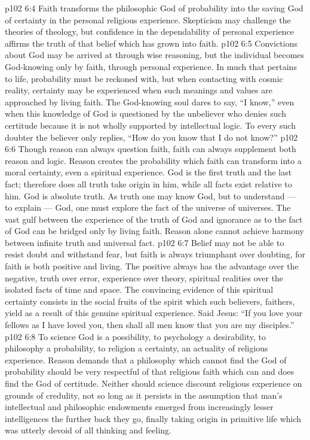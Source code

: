 \vs p102 6:4 Faith transforms the philosophic God of probability into the saving God of certainty in the personal religious experience. Skepticism may challenge the theories of theology, but confidence in the dependability of personal experience affirms the truth of that belief which has grown into faith.
\vs p102 6:5 Convictions about God may be arrived at through wise reasoning, but the individual becomes God\hyp{}knowing only by faith, through personal experience. In much that pertains to life, probability must be reckoned with, but when contacting with cosmic reality, certainty may be experienced when such meanings and values are approached by living faith. The God\hyp{}knowing soul dares to say, “I know,” even when this knowledge of God is questioned by the unbeliever who denies such certitude because it is not wholly supported by intellectual logic. To every such doubter the believer only replies, “How do you know that I do not know?”
\vs p102 6:6 \pc Though reason can always question faith, faith can always supplement both reason and logic. Reason creates the probability which faith can transform into a moral certainty, even a spiritual experience. God is the first truth and the last fact; therefore does all truth take origin in him, while all facts exist relative to him. God is absolute truth. As truth one may know God, but to understand --- to explain --- God, one must explore the fact of the universe of universes. The vast gulf between the experience of the truth of God and ignorance as to the fact of God can be bridged only by living faith. Reason alone cannot achieve harmony between infinite truth and universal fact.
\vs p102 6:7 Belief may not be able to resist doubt and withstand fear, but faith is always triumphant over doubting, for faith is both positive and living. The positive always has the advantage over the negative, truth over error, experience over theory, spiritual realities over the isolated facts of time and space. The convincing evidence of this spiritual certainty consists in the social fruits of the spirit which such believers, faithers, yield as a result of this genuine spiritual experience. Said Jesus: \textcolor{ubdarkred}{“If you love your fellows as I have loved you, then shall all men know that you are my disciples.”}
\vs p102 6:8 \pc To science God is a possibility, to psychology a desirability, to philosophy a probability, to religion a certainty, an actuality of religious experience. Reason demands that a philosophy which cannot find the God of probability should be very respectful of that religious faith which can and does find the God of certitude. Neither should science discount religious experience on grounds of credulity, not so long as it persists in the assumption that man’s intellectual and philosophic endowments emerged from increasingly lesser intelligences the further back they go, finally taking origin in primitive life which was utterly devoid of all thinking and feeling.
